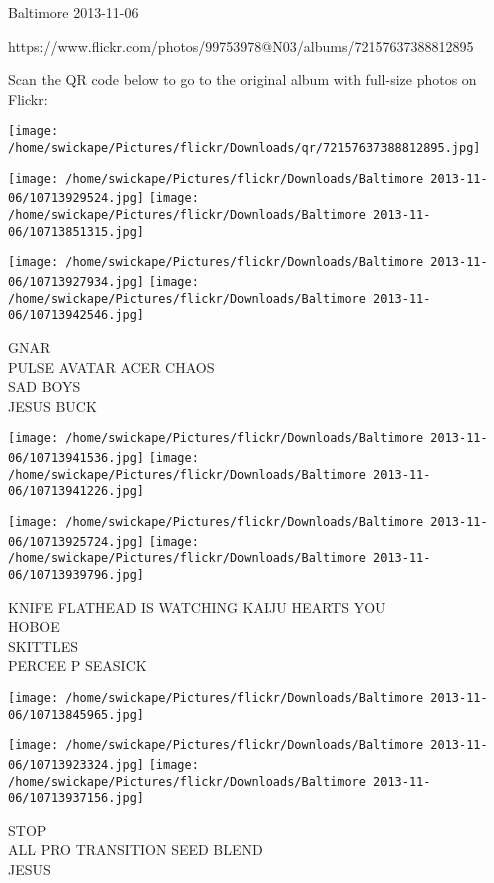 \documentclass[10pt,letterpaper]{article}
\begin{document}
Baltimore 2013-11-06

https://www.flickr.com/photos/99753978@N03/albums/72157637388812895

Scan the QR code below to go to the original album with full-size photos on Flickr:

\texttt{[image: /home/swickape/Pictures/flickr/Downloads/qr/72157637388812895.jpg]}
\pagebreak

\texttt{[image: /home/swickape/Pictures/flickr/Downloads/Baltimore 2013-11-06/10713929524.jpg]}
\texttt{[image: /home/swickape/Pictures/flickr/Downloads/Baltimore 2013-11-06/10713851315.jpg]}

\texttt{[image: /home/swickape/Pictures/flickr/Downloads/Baltimore 2013-11-06/10713927934.jpg]}
\texttt{[image: /home/swickape/Pictures/flickr/Downloads/Baltimore 2013-11-06/10713942546.jpg]}

GNAR\\
PULSE AVATAR ACER CHAOS\\
SAD BOYS\\
JESUS BUCK\\
\pagebreak

\texttt{[image: /home/swickape/Pictures/flickr/Downloads/Baltimore 2013-11-06/10713941536.jpg]}
\texttt{[image: /home/swickape/Pictures/flickr/Downloads/Baltimore 2013-11-06/10713941226.jpg]}

\texttt{[image: /home/swickape/Pictures/flickr/Downloads/Baltimore 2013-11-06/10713925724.jpg]}
\texttt{[image: /home/swickape/Pictures/flickr/Downloads/Baltimore 2013-11-06/10713939796.jpg]}

KNIFE FLATHEAD IS WATCHING KAIJU HEARTS YOU\\
HOBOE\\
SKITTLES\\
PERCEE P SEASICK\\
\pagebreak

\texttt{[image: /home/swickape/Pictures/flickr/Downloads/Baltimore 2013-11-06/10713845965.jpg]}

\vspace{0.25in}
\texttt{[image: /home/swickape/Pictures/flickr/Downloads/Baltimore 2013-11-06/10713923324.jpg]}
\texttt{[image: /home/swickape/Pictures/flickr/Downloads/Baltimore 2013-11-06/10713937156.jpg]}

STOP\\
ALL PRO TRANSITION SEED BLEND\\
JESUS\\
\pagebreak
\end{document}
